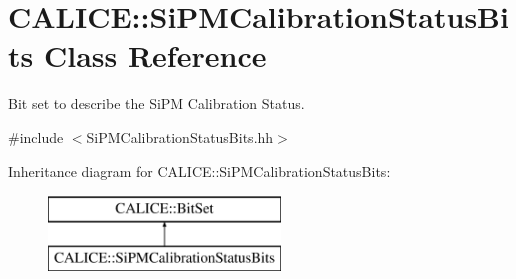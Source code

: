 \section{C\-A\-L\-I\-C\-E\-:\-:Si\-P\-M\-Calibration\-Status\-Bits Class Reference}
\label{classCALICE_1_1SiPMCalibrationStatusBits}


Bit set to describe the Si\-P\-M Calibration Status.  




{\ttfamily \#include $<$Si\-P\-M\-Calibration\-Status\-Bits.\-hh$>$}

Inheritance diagram for C\-A\-L\-I\-C\-E\-:\-:Si\-P\-M\-Calibration\-Status\-Bits\-:\begin{figure}[H]
\begin{center}
\leavevmode
\includegraphics[height=2.000000cm]{classCALICE_1_1SiPMCalibrationStatusBits}
\end{center}
\end{figure}
